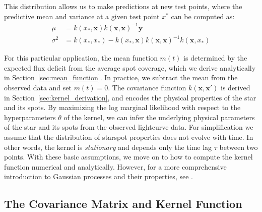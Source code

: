 \documentclass[preprint]{aastex702}
\begin{document}
This distribution allows us to make predictions at new test points, where the  predictive mean and variance at a given test point $x^*$ can be computed as:
\begin{align}
    \mu &= k(x_*,\mathbf{x}) k(\mathbf{x},\mathbf{x})^{-1} \mathbf{y} \\
    \sigma^2 &= k(x_*,x_*) - k(x_*,\mathbf{x}) k(\mathbf{x},\mathbf{x})^{-1} k(\mathbf{x},x_*)
\end{align}

For this particular application, the mean function $m(t)$ is determined by the expected flux deficit from the average spot coverage, which we derive analytically in Section~\ref{sec:mean_function}. In practice, we subtract the mean from the observed data and set $m(t) = 0$. The covariance function $k(\mathbf{x}, \mathbf{x}')$ is derived in Section~\ref{sec:kernel_derivation}, and encodes the physical properties of the star and its spots. By maximizing the log marginal likelihood with respect to the hyperparameters $\theta$ of the kernel, we can infer the underlying physical parameters of the star and its spots from the observed lightcurve data. For simplification we assume that the distribution of starspot properties does not evolve with time. In other words, the kernel is \emph{stationary} and depends only the time lag $\tau$ between two points.
With these basic assumptions, we move on to how to compute the kernel function numerical and analytically. However, for a more comprehensive introduction to Gaussian processes and their properties, see \citet{rasmussen_gaussian_2006}. 

\subsection{The Covariance Matrix and Kernel Function} \label{sec:covariance_matrix_numerical} 
\end{document}
